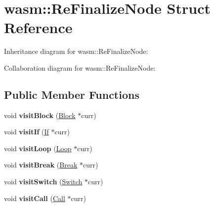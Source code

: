 \hypertarget{structwasm_1_1_re_finalize_node}{}\section{wasm\+:\+:Re\+Finalize\+Node Struct Reference}
\label{structwasm_1_1_re_finalize_node}


Inheritance diagram for wasm\+:\+:Re\+Finalize\+Node\+:


Collaboration diagram for wasm\+:\+:Re\+Finalize\+Node\+:
\subsection*{Public Member Functions}
\begin{DoxyCompactItemize}
\item 
\mbox{\label{structwasm_1_1_re_finalize_node_aa7adc726a7ef401324ee6f00c8c28b61}} 
void {\bfseries visit\+Block} (\mbox{\hyperlink{classwasm_1_1_block}{Block}} $\ast$curr)
\item 
\mbox{\label{structwasm_1_1_re_finalize_node_a90d89b5cba8ca6dbdf9be1a3758089bd}} 
void {\bfseries visit\+If} (\mbox{\hyperlink{classwasm_1_1_if}{If}} $\ast$curr)
\item 
\mbox{\label{structwasm_1_1_re_finalize_node_a07c309a23663a934fbeebb50748068a2}} 
void {\bfseries visit\+Loop} (\mbox{\hyperlink{classwasm_1_1_loop}{Loop}} $\ast$curr)
\item 
\mbox{\label{structwasm_1_1_re_finalize_node_a259e63c8222679fc70e40ae4cbabdead}} 
void {\bfseries visit\+Break} (\mbox{\hyperlink{classwasm_1_1_break}{Break}} $\ast$curr)
\item 
\mbox{\label{structwasm_1_1_re_finalize_node_a48c07157f492c4b687aa745895350532}} 
void {\bfseries visit\+Switch} (\mbox{\hyperlink{classwasm_1_1_switch}{Switch}} $\ast$curr)
\item 
\mbox{\label{structwasm_1_1_re_finalize_node_ae246b17221e3ffb6350e5be8b39a51fe}} 
void {\bfseries visit\+Call} (\mbox{\hyperlink{classwasm_1_1_call}{Call}} $\ast$curr)

\end{DoxyCompactItemize}
